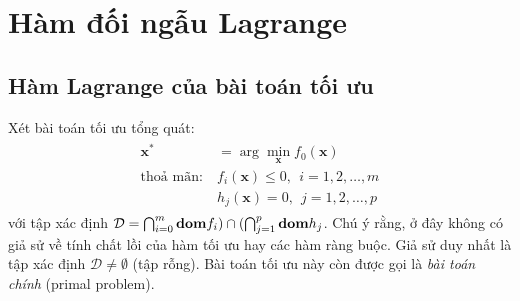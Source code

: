 




\section{Hàm đối ngẫu Lagrange}
\subsection{Hàm Lagrange của bài toán tối ưu}
Xét bài toán tối ưu tổng quát:
\begin{eqnarray}
\label{eqn:18_lagrangian}
\begin{aligned}
\mathbf{x}^* &= \arg\min_{\mathbf{x}} f_0(\mathbf{x}) \\
\text{thoả mãn:}~ & f_i(\mathbf{x}) \leq 0, ~~ i = 1, 2, \dots, m\\
& h_j(\mathbf{x}) = 0, ~~ j = 1, 2, \dots, p
\end{aligned}
\end{eqnarray}
với tập xác định $\mathcal{D} = \bigcap_{i=0}^m \boldsymbol{\mathbf{dom}} f_i) \cap (\bigcap_{j=1}^p \boldsymbol{\mathbf{dom}}
h_j$. Chú ý rằng, ở đây không có giả sử về tính chất lồi của hàm tối ưu
hay các hàm ràng buộc. Giả sử duy nhất là tập xác định $\mathcal{D} \neq
\emptyset$ (tập rỗng). Bài toán tối ưu này còn được gọi là \textit{bài toán chính} ({primal problem}).

